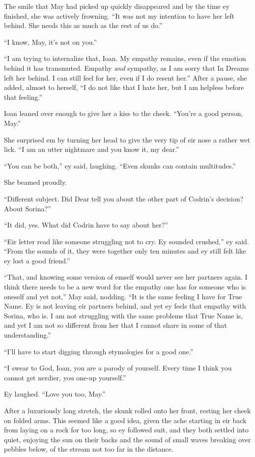 The smile that May had picked up quickly disappeared and by the time ey finished, she was actively frowning. ``It was not my intention to have her left behind. She needs this as much as the rest of us do.''

``I know, May, it's not on you.''

``I am trying to internalize that, Ioan. My empathy remains, even if the emotion behind it has transmuted. Empathy \emph{and} sympathy, as I am sorry that In Dreams left her behind. I can still feel for her, even if I do resent her.'' After a pause, she added, almost to herself, ``I do not like that I hate her, but I am helpless before that feeling.''

Ioan leaned over enough to give her a kiss to the cheek. ``You're a good person, May.''

She surprised em by turning her head to give the very tip of eir nose a rather wet lick. ``I am an utter nightmare and you know it, my dear.''

``You can be both,'' ey said, laughing. ``Even skunks can contain multitudes.''

She beamed proudly.

``Different subject. Did Dear tell you about the other part of Codrin's decision? About Sorina?''

``It did, yes. What did Codrin have to say about her?''

``Eir letter read like someone struggling not to cry. Ey sounded crushed,'' ey said. ``From the sounds of it, they were together only ten minutes and ey still felt like ey lost a good friend.''

``That, and knowing some version of emself would never see her partners again. I think there needs to be a new word for the empathy one has for someone who is oneself and yet not,'' May said, nodding. ``It is the same feeling I have for True Name. Ey is not leaving eir partners behind, and yet ey feels that empathy with Sorina, who is. I am not struggling with the same problems that True Name is, and yet I am not so different from her that I cannot share in some of that understanding.''

``I'll have to start digging through etymologies for a good one.''

``I swear to God, Ioan, you are a parody of yourself. Every time I think you cannot get nerdier, you one-up yourself.''

Ey laughed. ``Love you too, May.''

After a luxuriously long stretch, the skunk rolled onto her front, resting her cheek on folded arms. This seemed like a good idea, given the ache starting in eir back from laying on a rock for too long, so ey followed suit, and they both settled into quiet, enjoying the sun on their backs and the sound of small waves breaking over pebbles below, of the stream not too far in the distance.

